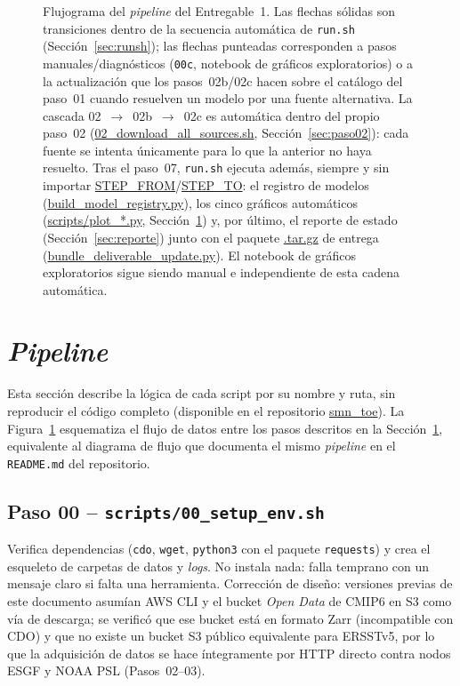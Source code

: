 \documentclass[11pt,a4paper]{article}
\newcommand{\archivo}[1]{\begingroup\hypersetup{urlcolor=black}\url{#1}\endgroup}
\begin{document}
\begin{figure}[htbp]
\begin{tikzpicture}
\end{tikzpicture}
\caption[Flujograma del \emph{pipeline} del Entregable~1.]{Flujograma del \emph{pipeline} del Entregable~1. Las flechas s\'olidas son transiciones dentro de la secuencia autom\'atica de \texttt{run.sh} (Secci\'on~\ref{sec:runsh}); las flechas punteadas corresponden a pasos manuales/diagn\'osticos (\texttt{00c}, notebook de gr\'aficos exploratorios) o a la actualizaci\'on que los pasos~02b/02c hacen sobre el cat\'alogo del paso~01 cuando resuelven un modelo por una fuente alternativa. La cascada 02~$\to$~02b~$\to$~02c es autom\'atica dentro del propio paso~02 (\archivo{02_download_all_sources.sh}, Secci\'on~\ref{sec:paso02}): cada fuente se intenta \'unicamente para lo que la anterior no haya resuelto. Tras el paso~07, \texttt{run.sh} ejecuta adem\'as, siempre y sin importar \archivo{STEP_FROM}/\archivo{STEP_TO}: el registro de modelos (\archivo{build_model_registry.py}), los cinco gr\'aficos autom\'aticos (\archivo{scripts/plot_*.py}, Secci\'on~\ref{sec:scripts}) y, por \'ultimo, el reporte de estado (Secci\'on~\ref{sec:reporte}) junto con el paquete \archivo{.tar.gz} de entrega (\archivo{bundle_deliverable_update.py}). El notebook de gr\'aficos exploratorios sigue siendo manual e independiente de esta cadena autom\'atica.}
\label{fig:flujograma}
\end{figure}

\section{\emph{Pipeline}}
\label{sec:scripts}

Esta secci\'on describe la l\'ogica de cada script por su nombre y ruta, sin reproducir el c\'odigo completo (disponible en el repositorio \archivo{smn_toe}).
La Figura~\ref{fig:flujograma} esquematiza el flujo de datos entre los pasos descritos en la Secci\'on~\ref{sec:scripts}, equivalente al diagrama de flujo que documenta el mismo \emph{pipeline} en el \texttt{README.md} del repositorio.


\subsection{Paso 00 -- \texttt{scripts/00\_setup\_env.sh}}
Verifica dependencias (\texttt{cdo}, \texttt{wget}, \texttt{python3} con el paquete \texttt{requests}) y crea el esqueleto de carpetas de datos y \emph{logs}. No instala nada: falla temprano con un mensaje claro si falta una herramienta. Correcci\'on de dise\~no: versiones previas de este documento asum\'ian AWS CLI y el bucket \emph{Open Data} de CMIP6 en S3 como v\'ia de descarga; se verific\'o que ese bucket est\'a en formato Zarr (incompatible con CDO) y que no existe un bucket S3 p\'ublico equivalente para ERSSTv5, por lo que la adquisici\'on de datos se hace \'integramente por HTTP directo contra nodos ESGF y NOAA PSL (Pasos~02--03).
\end{document}
